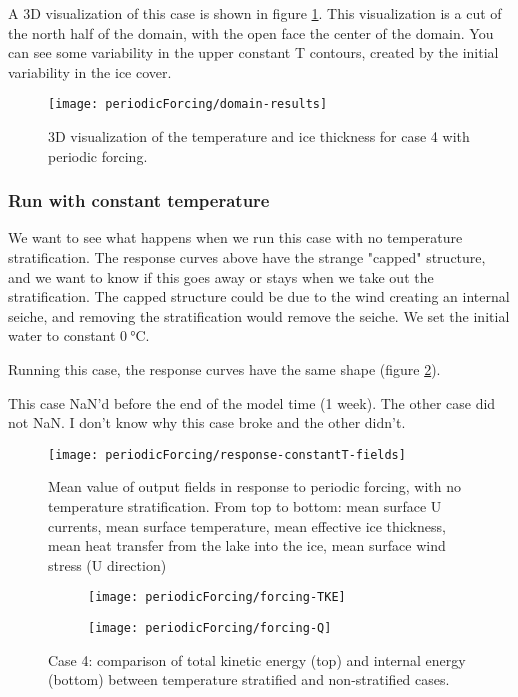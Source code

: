 \documentclass[11pt]{article}
\begin{document}
A 3D visualization of this case is shown in figure \ref{fig:periodicVisualization}. This visualization is a cut of the north half of the domain, with the open face the center of the domain. You can see some variability in the upper constant T contours, created by the initial variability in the ice cover.

\begin{figure}[h!]
\texttt{[image: periodicForcing/domain-results]}
\caption{3D visualization of the temperature and ice thickness for case 4 with periodic forcing.}
\label{fig:periodicVisualization}
\end{figure}

\subsubsection{Run with constant temperature}
We want to see what happens when we run this case with no temperature stratification. The response curves above have the strange "capped" structure, and we want to know if this goes away or stays when we take out the stratification. The capped structure could be due to the wind creating an internal seiche, and removing the stratification would remove the seiche. We set the initial water to constant $\SI{0}{\celsius}$.

Running this case, the response curves have the same shape (figure \ref{fig:periodicForcingResponseConstantT}).

This case NaN'd before the end of the model time (1 week). The other case did not NaN. I don't know why this case broke and the other didn't.

\begin{figure}[h!]
\texttt{[image: periodicForcing/response-constantT-fields]}
\caption{Mean value of output fields in response to periodic forcing, with no temperature stratification. From top to bottom: mean surface U currents, mean surface temperature, mean effective ice thickness, mean heat transfer from the lake into the ice, mean surface wind stress (U direction)}
\label{fig:periodicForcingResponseConstantT}
\end{figure}

\begin{figure}[h!]
\centering
\begin{subfigure}{0.48\linewidth}
\texttt{[image: periodicForcing/forcing-TKE]}
\caption{}
\label{fig:periodicForcingTKE}
\end{subfigure}
\begin{subfigure}{0.48\linewidth}
\texttt{[image: periodicForcing/forcing-Q]}
\caption{}
\label{fig:periodicForcingQ}
\end{subfigure}
\caption{Case 4: comparison of total kinetic energy (top) and internal energy (bottom) between temperature stratified and non-stratified cases.}
\end{figure}
\end{document}

